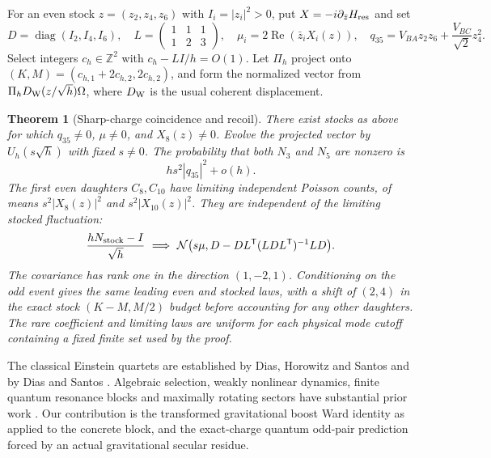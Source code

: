 \documentclass[11pt]{article}
\newtheorem{theorem}{Theorem}
\numberwithin{equation}{section}
\begin{document}
For an even stock \(z=(z_2,z_4,z_6)\) with \(I_i=|z_i|^2>0\),
put \(X=-i\partial_{\bar z}H_{\rm res}\) and set
\begin{equation}\label{eq:parameters}
 D=\operatorname{diag}(I_2,I_4,I_6),\quad
 L=\begin{pmatrix}1&1&1\\1&2&3\end{pmatrix},\quad
 \mu_i=2\operatorname{Re}(\bar z_i X_i(z)),\quad
 q_{35}=V_{BA}z_2z_6+\frac{V_{BC}}{\sqrt2}z_4^2 .
\end{equation}
Select integers \(c_h\in\mathbb Z^2\) with \(c_h-LI/h=O(1)\).
Let \(\Pi_h\) project onto
\((K,M)=(c_{h,1}+2c_{h,2},2c_{h,2})\), and form the normalized
vector from \(\Pi_h D_{\rm W}(z/\sqrt h)\Omega\), where \(D_{\rm W}\)
is the usual coherent displacement.
\begin{theorem}[Sharp-charge coincidence and recoil]\label{thm:packet}
There exist stocks as above for which \(q_{35}\ne0\),
\(\mu\ne0\), and \(X_8(z)\ne0\). Evolve the projected vector
by \(U_h(s\sqrt h)\) with fixed \(s\ne0\). The probability that both
\(N_3\) and \(N_5\) are nonzero is
\begin{equation}\label{eq:rare}
 h s^2 |q_{35}|^2+o(h).
\end{equation}
The first even daughters \(C_8,C_{10}\) have limiting independent
Poisson counts, of means \(s^2|X_8(z)|^2\) and \(s^2|X_{10}(z)|^2\).
They are independent of the limiting stocked fluctuation:
\begin{equation}\label{eq:gauss}
 \frac{hN_{\rm stock}-I}{\sqrt h}
 \ \Longrightarrow\
 {\cal N}\big(s\mu,D-DL^{\mathsf T}(LDL^{\mathsf T})^{-1}LD\big).
\end{equation}
The covariance has rank one in the direction \((1,-2,1)\).
Conditioning on the odd event gives the same leading even and
stocked laws, with a shift of \((2,4)\) in the exact stock
\((K-M,M/2)\) budget before accounting for any other daughters.
The rare coefficient and limiting laws are uniform for each
physical mode cutoff containing a fixed finite set used by the proof.
\end{theorem}
The classical Einstein quartets are established by Dias,
Horowitz and Santos and by Dias and Santos \cite{dhs,ds}.
Algebraic selection, weakly nonlinear dynamics, finite quantum
resonance blocks and maximally rotating sectors have substantial
prior work \cite{evninniv,evninreview,ep,cde,hk}. Our contribution
is the transformed gravitational boost Ward identity as applied
to the concrete block, and the exact-charge quantum odd-pair
prediction forced by an actual gravitational secular residue.
\end{document}
